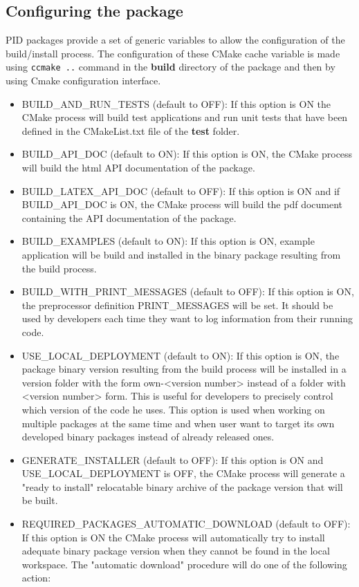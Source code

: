 \documentclass[12pt,a4paper]{article}
\begin{document}
\subsection{Configuring the package}
\label{sec:configCMake}

PID packages provide a set of generic variables to allow the configuration of the build/install process. The configuration of these CMake cache variable is made using \texttt{ccmake ..} command in the \textbf{build} directory of the package and then by using Cmake configuration interface.
\begin{itemize}
\item BUILD\_AND\_RUN\_TESTS (default to OFF): If this option is ON the CMake process will build test applications and run unit tests that have been defined in the CMakeList.txt file of the \textbf{test} folder.
\item BUILD\_API\_DOC (default to ON): If this option is ON, the CMake process will build the html API documentation of the package.
\item BUILD\_LATEX\_API\_DOC (default to OFF): If this option is ON and if BUILD\_API\_DOC is ON, the CMake process will build the pdf document containing the API documentation of the package.
\item BUILD\_EXAMPLES (default to ON): If this option is ON, example application will be build and installed in the binary package resulting from the build process.
\item BUILD\_WITH\_PRINT\_MESSAGES (default to OFF): If this option is ON, the preprocessor definition PRINT\_MESSAGES will be set. It should be used by developers each time they want to log information from their running code.
\item USE\_LOCAL\_DEPLOYMENT (default to ON): If this option is ON, the package binary version resulting from the build process will be installed in a version folder with the form own-<version number> instead of a folder with <version number> form. This is useful for developers to precisely control which version of the code he uses. This option is used when working on multiple packages at the same time and when user want to target its own developed binary packages instead of already released ones.
\item GENERATE\_INSTALLER (default to OFF): If this option is ON and USE\_LOCAL\_DEPLOYMENT is OFF, the CMake process will generate a "ready to install" relocatable binary archive of the package version that will be built. 
\item REQUIRED\_PACKAGES\_AUTOMATIC\_DOWNLOAD (default to OFF): If this option is ON the CMake process will automatically try to install adequate binary package version when they cannot be found in the local workspace. The "automatic download" procedure will do one of the following  action:

\end{itemize}
\end{document}
